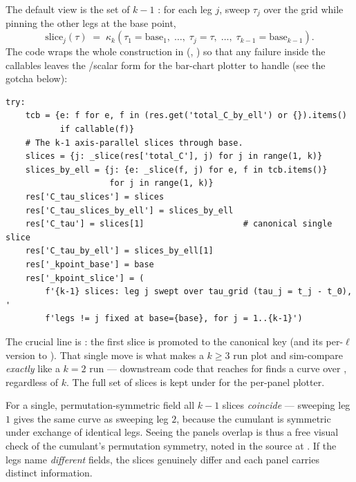 The default view is the set of $k-1$ : for each leg
$j$, sweep $\tau_j$ over the grid while pinning the other legs at the base point,
\begin{equation}
  \mathrm{slice}_j(\tau)
  \;=\;
  \kappa_k\!\left(\tau_1=\text{base}_1,\;\ldots,\;\tau_j=\tau,\;\ldots,\;\tau_{k-1}=\text{base}_{k-1}\right).
\end{equation}
The code wraps the whole construction in 
(, ) so that any failure inside the
callables leaves the /scalar form for the bar-chart plotter to handle
(see the gotcha below):

\begin{lstlisting}
try:
    tcb = {e: f for e, f in (res.get('total_C_by_ell') or {}).items()
           if callable(f)}
    # The k-1 axis-parallel slices through base.
    slices = {j: _slice(res['total_C'], j) for j in range(1, k)}
    slices_by_ell = {j: {e: _slice(f, j) for e, f in tcb.items()}
                     for j in range(1, k)}
    res['C_tau_slices'] = slices
    res['C_tau_slices_by_ell'] = slices_by_ell
    res['C_tau'] = slices[1]                    # canonical single slice
    res['C_tau_by_ell'] = slices_by_ell[1]
    res['_kpoint_base'] = base
    res['_kpoint_slice'] = (
        f'{k-1} slices: leg j swept over tau_grid (tau_j = t_j - t_0), '
        f'legs != j fixed at base={base}, for j = 1..{k-1}')
\end{lstlisting}

The crucial line is : the first slice is promoted
to the canonical  key (and its per-$\ell$ version to
). That single move is what makes a $k\ge3$ run plot and
sim-compare \emph{exactly} like a $k=2$ run --- downstream code that reaches for
 finds a curve over , regardless of $k$. The full set
of slices is kept under  for the per-panel plotter.

\begin{note}
For a single, permutation-symmetric field all $k-1$ slices \emph{coincide} ---
sweeping leg $1$ gives the same curve as sweeping leg $2$, because the cumulant is
symmetric under exchange of identical legs. Seeing the panels overlap is thus a
free visual check of the cumulant's permutation symmetry, noted in the source at
. If the legs name \emph{different} fields,
the slices genuinely differ and each panel carries distinct information.
\end{note}

